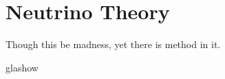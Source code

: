 \setchapterpreamble[u]{\margintoc}
\section{Neutrino Theory}
\begin{fquote} Though this be madness, yet there is method in it.
\end{fquote}
glashow
